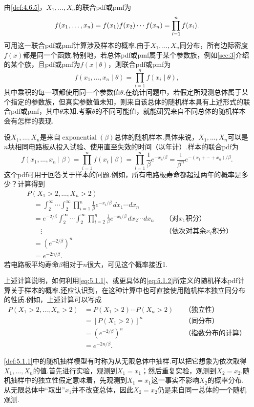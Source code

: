 由\autoref{def:4.6.5}，$X_1,\ldots,X_n$的联合pdf或pmf为
\begin{equation}\label{eq:5.1.1}\index{SI0839@样本}\index{SI0857@样本}\index{SI0932@概率密度函数与概率质量函数}
f(x_1,\ldots,x_n)=f(x_1)f(x_2)\cdots f(x_n)=\prod_{i=1}^n f(x_i).
\end{equation}
可用这一联合pdf或pmf计算涉及样本的概率.由于$X_1,\ldots,X_n$同分布，所有边际密度$f(x)$都是同一个函数.特别地，若总体pdf或pmf属于某个参数族，例如\autoref{sec:3}介绍的某个族，且pdf或pmf为$f(x\mid\theta)$，则联合pdf或pmf为
\begin{equation}\label{eq:5.1.2}
f(x_1,\ldots,x_n\mid\theta)=\prod_{i=1}^n f(x_i\mid\theta),
\end{equation}
其中乘积的每一项都使用同一个参数值$\theta$.在统计问题中，若假定所观测总体属于某个指定的参数族，但真实参数值未知，则来自该总体的随机样本具有上述形式的联合pdf或pmf，其中$\theta$未知.考察$\theta$的不同可能值，就能研究来自不同总体的随机样本会有怎样的表现.
\begin{example}\label{ex:5.1.2}
设$X_1,\ldots,X_n$是来自$\operatorname{exponential}(\beta)$总体的随机样本.具体来说，$X_1,\ldots,X_n$可以是$n$块相同电路板从投入试验、使用直至失效的时间（以年计）.样本的联合pdf为
$$f(x_1,\ldots,x_n\mid\beta)=\prod_{i=1}^n f(x_i\mid\beta)=\prod_{i=1}^n\frac1\beta e^{-x_i/\beta}=\frac1{\beta^n}e^{-(x_1+\cdots+x_n)/\beta}.$$
这个pdf可用于回答关于样本的问题.例如，所有电路板寿命都超过两年的概率是多少？计算得到
\begin{align*}
&P(X_1>2,\ldots,X_n>2)\\
&\quad=\int_2^\infty\cdots\int_2^\infty\prod_{i=1}^n\frac1\beta e^{-x_i/\beta}\,dx_1\cdots dx_n\\
&\quad=e^{-2/\beta}\int_2^\infty\cdots\int_2^\infty\prod_{i=2}^n\frac1\beta e^{-x_i/\beta}\,dx_2\cdots dx_n&&\text{（对$x_1$积分）}\\
&\qquad\vdots&&\text{（依次对其余$x_i$积分）}\\
&\quad=(e^{-2/\beta})^n\\
&\quad=e^{-2n/\beta}.
\end{align*}
若电路板平均寿命$\beta$相对于$n$很大，可见这个概率接近1.

上述计算说明，如何利用\eqref{eq:5.1.1}、或更具体的\eqref{eq:5.1.2}所定义的随机样本pdf计算关于样本的概率.还应认识到，在这种计算中也可直接使用随机样本独立同分布的性质.例如，上述计算可以写成
\begin{align*}
P(X_1>2,\ldots,X_n>2)&=P(X_1>2)\cdots P(X_n>2)&&\text{（独立性）}\\
&=[P(X_1>2)]^n&&\text{（同分布）}\\
&=(e^{-2/\beta})^n&&\text{（指数分布的计算）}\\
&=e^{-2n/\beta}.
\end{align*}
\end{example}
\autoref{def:5.1.1}中的随机抽样模型有时称为从无限总体中抽样.可以把它想象为依次取得$X_1,\ldots,X_n$的值.首先进行实验，观测到$X_1=x_1$；然后重复实验，观测到$X_2=x_2$.随机抽样中的独立性假定意味着，先观测到$X_1=x_1$这一事实不影响$X_2$的概率分布.从无限总体中“取出”$x_1$并不改变总体，因此$X_2=x_2$仍是来自同一总体的一个随机观测.

